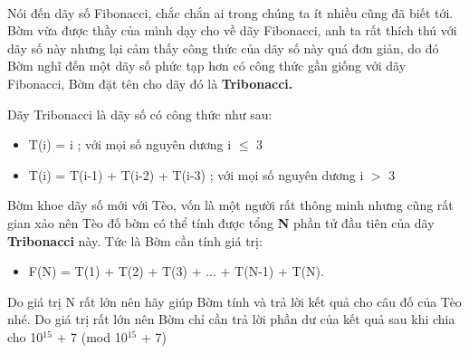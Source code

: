  

Nói đến dãy số Fibonacci, chắc chắn ai trong chúng ta ít nhiều cũng đã biết tới. Bờm vừa được thầy của mình dạy cho về dãy Fibonacci, anh ta rất thích thú với dãy số này nhưng lại cảm thấy công thức của dãy số này quá đơn giản, do đó Bờm nghĩ đến một dãy số phức tạp hơn có công thức gần giống với dãy Fibonacci, Bờm đặt tên cho dãy đó là \textbf{ Tribonacci. }

Dãy Tribonacci là dãy số có công thức như sau:
\begin{itemize}
	\item T(i) = i ; với mọi số nguyên dương i  $\le$  3
	\item T(i) = T(i-1) + T(i-2) + T(i-3) ; với mọi số nguyên dương i $>$ 3
\end{itemize}

Bờm khoe dãy số mới với Tèo, vốn là một người rất thông minh nhưng cũng rất gian xảo nên Tèo đố bờm có thể tính được tổng \textbf{ N } phần tử đầu tiên của dãy \textbf{ Tribonacci } này. Tức là Bờm cần tính giá trị:
\begin{itemize}
	\item F(N) = T(1) + T(2) + T(3) + ... + T(N-1) + T(N).
\end{itemize}

Do giá trị N rất lớn nên hãy giúp Bờm tính và trả lời kết quả cho câu đố của Tèo nhé. Do giá trị rất lớn nên Bờm chỉ cần trả lời phần dư của kết quả sau khi chia cho 10$^15 $ + 7 (mod 10$^15 $ + 7)

\